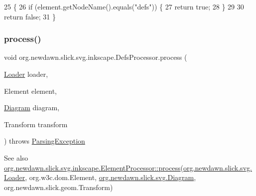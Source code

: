 \begin{DoxyCode}
25                                             \{
26         \textcolor{keywordflow}{if} (element.getNodeName().equals(\textcolor{stringliteral}{"defs"})) \{
27             \textcolor{keywordflow}{return} \textcolor{keyword}{true};
28         \}
29         
30         \textcolor{keywordflow}{return} \textcolor{keyword}{false};
31     \}
\end{DoxyCode}
\mbox{\label{classorg_1_1newdawn_1_1slick_1_1svg_1_1inkscape_1_1_defs_processor_a1ed9ee8ac601c75d66568a7c5dc84e17}} 
\subsubsection{\texorpdfstring{process()}{process()}}
{\footnotesize\ttfamily void org.\+newdawn.\+slick.\+svg.\+inkscape.\+Defs\+Processor.\+process (\begin{DoxyParamCaption}\item[{\mbox{\hyperlink{interfaceorg_1_1newdawn_1_1slick_1_1svg_1_1_loader}{Loader}}}]{loader,  }\item[{Element}]{element,  }\item[{\mbox{\hyperlink{classorg_1_1newdawn_1_1slick_1_1svg_1_1_diagram}{Diagram}}}]{diagram,  }\item[{Transform}]{transform }\end{DoxyParamCaption}) throws \mbox{\hyperlink{classorg_1_1newdawn_1_1slick_1_1svg_1_1_parsing_exception}{Parsing\+Exception}}\hspace{0.3cm}{\ttfamily [inline]}}

\begin{DoxySeeAlso}{See also}
\mbox{\hyperlink{interfaceorg_1_1newdawn_1_1slick_1_1svg_1_1inkscape_1_1_element_processor_acd170a9e1119481edae885780db59a2e}{org.\+newdawn.\+slick.\+svg.\+inkscape.\+Element\+Processor\+::process}}(\mbox{\hyperlink{interfaceorg_1_1newdawn_1_1slick_1_1svg_1_1_loader}{org.\+newdawn.\+slick.\+svg.\+Loader}}, org.\+w3c.\+dom.\+Element, \mbox{\hyperlink{classorg_1_1newdawn_1_1slick_1_1svg_1_1_diagram}{org.\+newdawn.\+slick.\+svg.\+Diagram}}, org.\+newdawn.\+slick.\+geom.\+Transform) 
\end{DoxySeeAlso}


